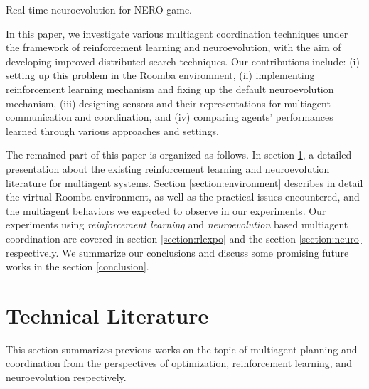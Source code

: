 \documentclass[conference]{IEEEtran}
\begin{document}
\cite{stanley2005real} Real time neuroevolution for NERO game. 

In this paper, we
investigate various multiagent coordination techniques under the framework of
reinforcement learning and neuroevolution, with the aim of developing improved
distributed search techniques. 
Our contributions include: 
(i) setting up this problem in the Roomba environment, 
(ii) implementing reinforcement learning mechanism and fixing up the default
neuroevolution mechanism, 
(iii) designing sensors and their representations for multiagent
communication and coordination, and 
(iv) comparing agents' performances learned through various approaches and
settings.

The remained part of this paper is organized as follows. 
In section \ref{section:literature}, a detailed presentation about the
existing reinforcement learning and neuroevolution literature
for multiagent systems.  
Section \ref{section:environment} describes in detail the virtual Roomba
environment, as well as the practical issues encountered, and the multiagent
behaviors we expected to observe in our experiments.  
Our experiments using 
\textit{reinforcement learning} and \textit{neuroevolution} based
multiagent coordination are covered in section \ref{section:rlexpo}
and the section \ref{section:neuro} respectively.  
We summarize our conclusions and discuss some promising future works in the
section \ref{conclusion}. 



\section{Technical Literature} \label{section:literature}
This section summarizes previous works on the topic of multiagent planning and
coordination from the perspectives of optimization, reinforcement learning,
and neuroevolution respectively.
\end{document}

